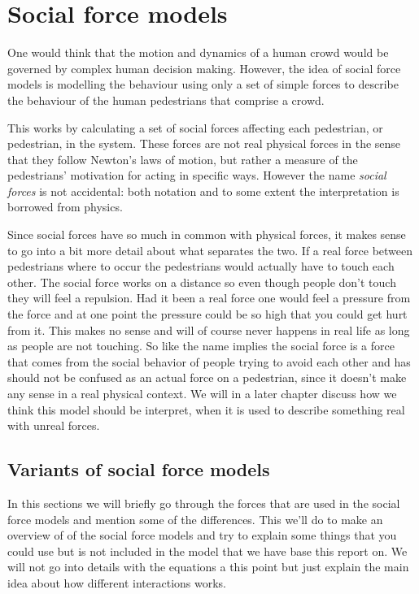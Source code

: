 \section{Social force models}
\label{sec:social-forces}
One would think that the motion and dynamics of a human crowd would be 
governed by complex human decision making. However, the idea of social force 
models is modelling the behaviour using only a set of simple forces to 
describe the behaviour of the human pedestrians that comprise a crowd.

This works by calculating a set of social forces affecting each pedestrian, or 
pedestrian, in the system. These forces are not real physical forces in the sense 
that they follow Newton's laws of motion, but rather a measure of the pedestrians' 
motivation for acting in specific ways. However the name \emph{social forces} 
is not accidental: both notation and to some extent the interpretation is 
borrowed from physics. 

Since social forces have so much in common with physical forces, it makes 
sense to go into a bit more detail about what separates the two. If a real force between pedestrians where to occur the pedestrians would actually have to touch each other. The social force works on a distance so even though people don't touch they will feel a repulsion. Had it been a real force one would feel a pressure from the force and at one point the pressure could be so high that you could get hurt from it. This makes no sense and will of course never happens in real life as long as people are not touching. So like the name implies the social force is a force that comes from the social behavior of people trying to avoid each other and has should not be confused as an actual force on a pedestrian, since it doesn't make any sense in a real physical context.  We will in a later chapter discuss how we think this model should be interpret, when it is used to describe something real with unreal forces.   


\subsection{Variants of social force models}
In this sections we will briefly go through the forces that are used in the social force models and mention some of the differences. This we'll do to make an overview of of the social force models and try to explain some things that you could use but is not included in the model that we have base this report on. We will not go into details with the equations a this point but just explain the main idea about how different interactions works. 

